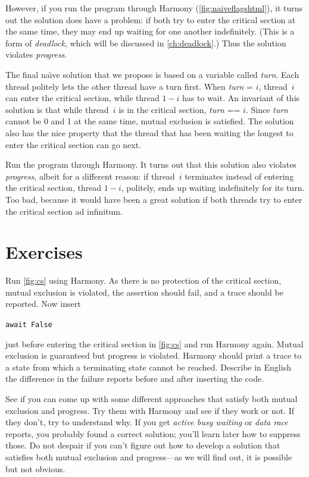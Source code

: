 \documentclass{report}
\newenvironment{code}{
\tcolorbox
}{
\endtcolorbox
}
\begin{document}
However, if you run the program through Harmony (\autoref{fig:naiveflagshtml}),
it turns out the solution
does have a problem: if both try to enter the critical section at the same
time, they may end up waiting for one another indefinitely.
(This is a form of \emph{deadlock}, which will be discussed in
\autoref{ch:deadlock}.)
Thus the
solution violates \emph{progress}.

The final na\"{\i}ve solution that we propose
is based on a variable called \textit{turn}.
Each thread politely lets the other thread have a turn first.
When \textit{turn} = $i$, thread~$i$ can
enter the critical section, while thread $1-i$ has to wait.
An invariant of this solution is that while thread~$i$ is in the critical
section, \textit{turn} == $i$.
Since \textit{turn} cannot be 0 and 1 at
the same time, mutual exclusion is satisfied.
The solution also has the nice property that the thread that has been waiting the
longest to enter the critical section can go next.

Run the program through Harmony.  It turns out that this solution also violates
\emph{progress}, albeit for a different reason:
if thread~$i$ terminates instead of entering the critical section,
thread $1-i$, politely, ends up waiting indefinitely for its turn.
Too bad, because it would have been a great solution if both
threads try to enter the critical section ad infinitum.

\section*{Exercises}
\begin{problems}
\item Run \autoref{fig:cs} using Harmony.  As there is no protection of the critical
section, mutual exclusion is violated,
the assertion should fail, and a trace should be reported.
Now insert
\begin{code}
\texttt{await False}
\end{code}
just before entering the critical section
in \autoref{fig:cs} and run Harmony again.
Mutual exclusion is guaranteed but progress is violated.
Harmony should print a trace
to a state from which a terminating state cannot be reached.
Describe in English the difference in the failure reports before
and after inserting the code.
\item See if you can come up with some different approaches that satisfy both
mutual exclusion and progress.  Try them with Harmony and see if they work or not.
If they don't, try to understand why.
If you get \emph{active busy waiting} or \emph{data race} reports, you probably
found a correct solution; you'll learn later how to suppress those.
Do not despair if you can't figure out how to develop a solution that satisfies both
mutual exclusion and progress---as we will find out, it is possible but not obvious.
\end{problems}
\end{document}
